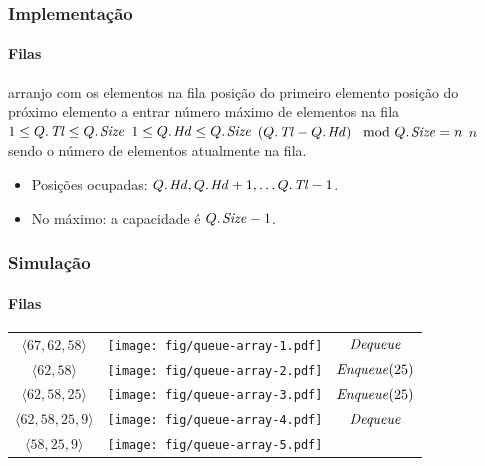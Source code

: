 \documentclass{beamer}
\begin{document}
\begin{frame}

  \frametitle{Implementação}
  \framesubtitle{Filas}

  \begin{codebox}
    \zi {} \> \> \> \Comment arranjo com os elementos na fila
    \zi {}   \> \> \> \Comment posição do primeiro elemento
    \zi {}   \> \> \> \Comment posição do próximo elemento a entrar
    \zi {} \> \> \> \Comment número máximo de elementos na fila
    \zi $1 \le \attrib{Q}{Tl} \le \attrib{Q}{Size}$
    \zi $1 \le \attrib{Q}{Hd} \le \attrib{Q}{Size}$
    \zi $\left( \attrib{Q}{Tl} - \attrib{Q}{Hd} \right) \mod \attrib{Q}{Size} = n$
    \zi \Comment $n$ sendo o número de elementos atualmente na fila.
  \end{codebox}
  \begin{itemize}
  \item Posições ocupadas: $\attrib{Q}{Hd}, \attrib{Q}{Hd}+1, \ldots
  \attrib{Q}{Tl}-1$.
  \item No máximo: a capacidade é $\attrib{Q}{Size} - 1$.
  \end{itemize}
  
\end{frame}

\begin{frame}
  \frametitle{Simulação}
  \framesubtitle{Filas}

  \begin{center}
    \begin{tabular}{ccc}
      $\langle 67, 62, 58 \rangle$ &
      \texttt{[image: fig/queue-array-1.pdf]}
      \pause
      &
      $\id{Dequeue}$ \pause
      \\
      $\langle 62, 58 \rangle$ &
      \texttt{[image: fig/queue-array-2.pdf]}
      \pause
      &
      $\id{Enqueue}(25)$ \pause
      \\
      $\langle 62, 58, 25 \rangle$ &
      \texttt{[image: fig/queue-array-3.pdf]}
      \pause
      &
      $\id{Enqueue}(25)$ \pause
      \\
      $\langle 62, 58, 25, 9 \rangle$ &
      \texttt{[image: fig/queue-array-4.pdf]}
      &
      $\id{Dequeue}$ \pause
      \\
      $\langle 58, 25, 9 \rangle$ &
      \texttt{[image: fig/queue-array-5.pdf]}
      &
    \end{tabular}
  \end{center}

\end{frame}
\end{document}
